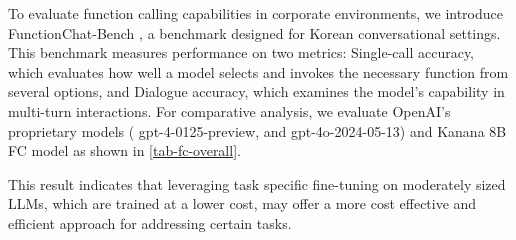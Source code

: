 \begin{table}[hbt!]
\centering
{}
\caption{Evaluation on FunctionChat-Bench: Single-call and Dialogue Accuracy}
\label{tab-fc-overall}
\end{table}

To evaluate function calling capabilities in corporate environments, we introduce FunctionChat-Bench \citep{lee2024functionchat}, a benchmark designed for Korean conversational settings.
This benchmark measures performance on two metrics: Single-call accuracy, which evaluates how well a model selects and invokes the necessary function from several options, and Dialogue accuracy, which examines the model’s capability in multi-turn interactions. 
For comparative analysis, we evaluate OpenAI’s proprietary models (
gpt-4-0125-preview, and gpt-4o-2024-05-13) and Kanana 8B FC model as shown in \autoref{tab-fc-overall}.


This result indicates that leveraging task specific fine-tuning on moderately sized LLMs, which are trained at a lower cost, may offer a more cost effective and efficient approach for addressing certain tasks.